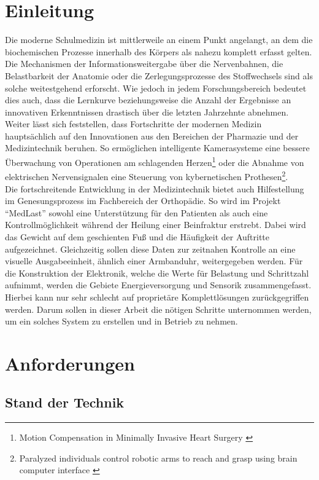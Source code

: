 \documentclass[12pt]{scrreprt} %
\begin{document}
\chapter{Einleitung}
Die moderne Schulmedizin ist mittlerweile an einem Punkt angelangt, an dem die biochemischen Prozesse innerhalb des Körpers als nahezu komplett erfasst gelten. Die Mechanismen der Informationsweitergabe über die Nervenbahnen, die Belastbarkeit der Anatomie oder die Zerlegungsprozesse des Stoffwechsels sind als solche weitestgehend erforscht. Wie jedoch in jedem Forschungsbereich bedeutet dies auch, dass die Lernkurve beziehungsweise die Anzahl der Ergebnisse an innovativen Erkenntnissen drastisch über die letzten Jahrzehnte abnehmen. Weiter lässt sich feststellen, dass Fortschritte der modernen Medizin hauptsächlich auf den Innovationen aus den Bereichen der Pharmazie und der Medizintechnik beruhen. So ermöglichen intelligente Kamerasysteme eine bessere Überwachung von Operationen am schlagenden Herzen\footnote{Motion Compensation in Minimally Invasive Heart Surgery \citep{DLR}} oder die Abnahme von elektrischen Nervensignalen eine Steuerung von kybernetischen Prothesen\footnote{Paralyzed individuals control robotic arms to reach and grasp using brain computer interface \citep{DLR2}}.\\
Die fortschreitende Entwicklung in der Medizintechnik bietet auch Hilfestellung im Genesungsprozess im Fachbereich der Orthopädie. So wird im Projekt "`MedLast"' sowohl eine Unterstützung für den Patienten als auch eine Kontrollmöglichkeit während der Heilung einer Beinfraktur erstrebt. Dabei wird das Gewicht auf dem geschienten Fuß und die Häufigkeit der Auftritte aufgezeichnet. Gleichzeitig sollen diese Daten zur zeitnahen Kontrolle an eine visuelle Ausgabeeinheit, ähnlich einer Armbanduhr, weitergegeben werden. Für die Konstruktion der Elektronik, welche die Werte für Belastung und Schrittzahl aufnimmt, werden die Gebiete Energieversorgung und Sensorik zusammengefasst. Hierbei kann nur sehr schlecht auf proprietäre Komplettlösungen zurückgegriffen werden. Darum sollen in dieser Arbeit die nötigen Schritte unternommen werden, um ein solches System zu erstellen und in Betrieb zu nehmen.
\chapter{Anforderungen}
\section{Stand der Technik}
\end{document}
